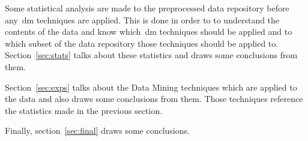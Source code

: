 Some statistical analysis are made to the preprocessed data repository before
any~\gls{dm} techniques are applied. This is done in order to to understand the
contents of the data and know which~\gls{dm} techniques should be applied and
to which subset of the data repository those techniques should be applied to.
Section~\ref{sec:stats} talks about these statistics and draws some conclusions
from them.

Section~\ref{sec:exps} talks about the Data Mining techniques which are applied
to the data and also draws some conclusions from them. Those techniques
reference the statistics made in the previous section.

Finally, section~\ref{sec:final} draws some conclusions.
